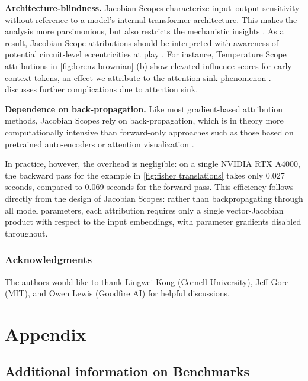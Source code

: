 \documentclass{article}
\begin{document}
\noindent\textbf{Architecture-blindness.}
Jacobian Scopes characterize input--output sensitivity without reference to a model’s internal transformer architecture.
This makes the analysis more parsimonious, but also restricts the mechanistic insights \cite{Clark-Berts-Attention-2019}.
As a result, Jacobian Scope attributions should be interpreted with awareness of potential circuit-level eccentricities at play \cite{ameisen2025circuit,lieberum2024gemmascopeopensparse}.
For instance, Temperature Scope attributions in \cref{fig:lorenz brownian} (b) show elevated influence scores for early context tokens, an effect we attribute to the attention sink phenomenon \cite{Xiao-attention-sink-2024}.
 discusses further complications due to attention sink.

\noindent\textbf{Dependence on back-propagation.}
Like most gradient-based attribution methods, Jacobian Scopes rely on back-propagation, which is in theory more computationally intensive than forward-only approaches such as those based on pretrained auto-encoders \cite{lieberum2024gemmascopeopensparse} or attention visualization \cite{Clark-Berts-Attention-2019}.

In practice, however, the overhead is negligible: on a single NVIDIA RTX A4000, the backward pass for the example in \cref{fig:fisher translations} takes only 0.027 seconds, compared to 0.069 seconds for the forward pass.
This efficiency follows directly from the design of Jacobian Scopes: rather than backpropagating through all model parameters, each attribution requires only a single vector-Jacobian product with respect to the input embeddings, with parameter gradients disabled throughout.

\subsubsection*{Acknowledgments}
The authors would like to thank Lingwei Kong (Cornell University), Jeff Gore (MIT), and Owen Lewis (Goodfire AI) for helpful discussions.





\appendix
\section{Appendix}
\subsection{Additional information on Benchmarks}
\label{sec:benchmark_details}
\end{document}
